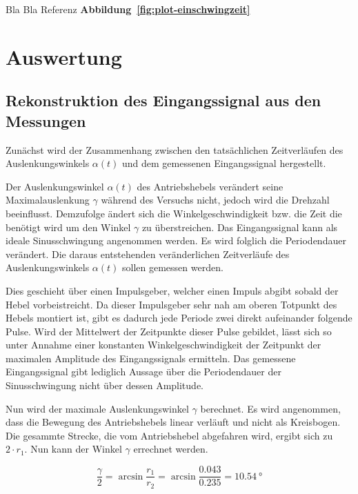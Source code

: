 \documentclass[a4paper,12pt]{scrartcl}
\begin{document}
Bla Bla Referenz \textbf{Abbildung~\ref{fig:plot-einschwingzeit}}

\section{Auswertung}

\subsection{Rekonstruktion des Eingangssignal aus den Messungen}

Zunächst wird der Zusammenhang zwischen den tatsächlichen Zeitverläufen des Auslenkungswinkels $\alpha \left( t \right)$ und dem gemessenen Eingangssignal hergestellt.

Der Auslenkungswinkel $\alpha \left( t \right)$ des Antriebshebels verändert seine Maximalauslenkung $\gamma$ während des Versuchs nicht, jedoch wird die Drehzahl beeinflusst.
Demzufolge ändert sich die Winkelgeschwindigkeit bzw. die Zeit die benötigt wird um den Winkel $\gamma$ zu überstreichen.
Das Eingangssignal kann als ideale Sinusschwingung angenommen werden.
Es wird folglich die Periodendauer verändert. Die daraus entstehenden veränderlichen Zeitverläufe des Auslenkungswinkels $\alpha \left( t \right)$ sollen gemessen werden.

Dies geschieht über einen Impulsgeber, welcher einen Impuls abgibt sobald der Hebel vorbeistreicht.
Da dieser Impulsgeber sehr nah am oberen Totpunkt des Hebels montiert ist, gibt es dadurch jede Periode zwei direkt aufeinander folgende Pulse.
Wird der Mittelwert der Zeitpunkte dieser Pulse gebildet, lässt sich so unter Annahme einer konstanten Winkelgeschwindigkeit der Zeitpunkt der maximalen Amplitude des Eingangssignals ermitteln.
Das gemessene Eingangssignal gibt lediglich Aussage über die Periodendauer der Sinusschwingung nicht über dessen Amplitude.

Nun wird der maximale Auslenkungswinkel $\gamma$ berechnet. Es wird angenommen, dass die Bewegung des Antriebshebels linear verläuft und nicht als Kreisbogen.
Die gesammte Strecke, die vom Antriebshebel abgefahren wird, ergibt sich zu $2 \cdot r_1$. Nun kann der Winkel $\gamma$ errechnet werden.

\begin{equation}
	\frac{\gamma}{2} = \arcsin{\frac{r_1}{r_2}} = \arcsin{\frac{0.043}{0.235}} =  \SI{10.54}{\degree}
\end{equation}
\end{document}
